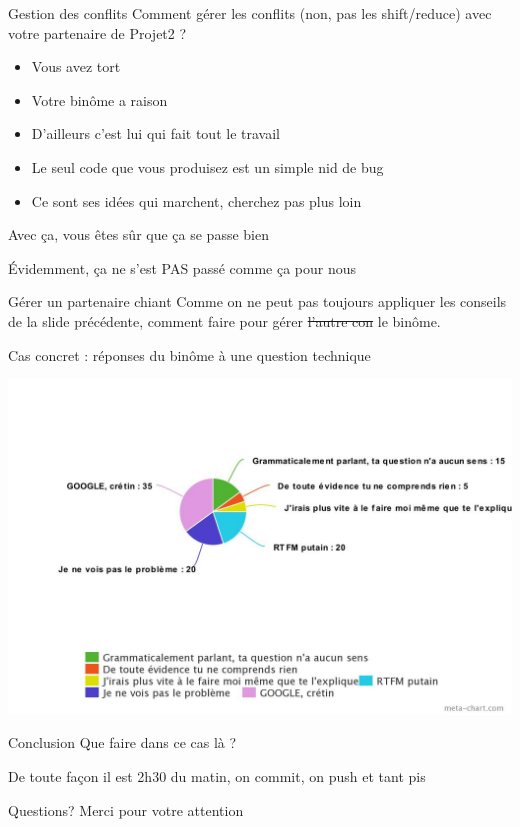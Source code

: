 \documentclass[pdf]{beamer}
\begin{document}
\begin{frame}{Gestion des conflits }
Comment gérer les conflits (non, pas les shift/reduce) avec votre partenaire de Projet2 ?
\pause
\begin{itemize}
\item Vous avez tort
\pause
\item Votre binôme a raison
\pause
\item D'ailleurs c'est lui qui fait tout le travail
\pause
\item Le seul code que vous produisez est un simple nid de bug
\pause
\item Ce sont ses idées qui marchent, cherchez pas plus loin
\end{itemize}
\pause
Avec ça, vous êtes sûr que ça se passe bien
\pause

Évidemment, ça ne s'est PAS passé comme ça pour nous
\end{frame}

\begin{frame}{Gérer un partenaire chiant}
Comme on ne peut pas toujours appliquer les conseils de la slide précédente, comment faire pour gérer \sout{l'autre con} le binôme.

\pause

Cas concret : réponses du binôme à une question technique

\pause
\begin{center}
\vspace{-0.5cm}
\includegraphics[scale=.24]{meta-chart}

\end{center}

\end{frame}

\begin{frame}{Conclusion}
Que faire dans ce cas là ? 
\pause

De toute façon il est 2h30 du matin, on commit, on push et tant pis
\end{frame}

\begin{frame}{Questions?}
Merci pour votre attention
\end{frame}
\end{document}
